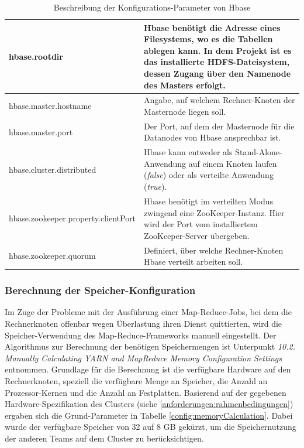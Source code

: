 \begin{table}
	\begin{tabularx}{\textwidth}{| X | X |} \hline
	hbase.rootdir &  Hbase benötigt die Adresse eines Filesystems, wo es die Tabellen ablegen kann. In dem Projekt ist es das installierte
	HDFS-Dateisystem, dessen Zugang über den Namenode des Masters erfolgt.\\ \hline
	hbase.master.hostname & Angabe, auf welchem Rechner-Knoten der Masternode liegen soll.\\ \hline
	hbase.master.port & Der Port, auf dem der Masternode für die Datanodes von Hbase ansprechbar ist. \\ \hline
	hbase.cluster.distributed & Hbase kann entweder als Stand-Alone-Anwendung auf einem Knoten laufen (\textit{false}) oder als verteilte
	 Anwendung (\textit{true}). \\ \hline
	hbase.zookeeper.property.clientPort & Hbase benötigt im verteilten Modus zwingend eine ZooKeeper-Instanz. Hier wird der Port vom
	 installiertem ZooKeeper-Server übergeben.\\ \hline
	hbase.zookeeper.quorum &  Definiert, über welche Rechner-Knoten Hbase verteilt arbeiten soll. \\ \hline
	\end{tabularx}
	\caption{Beschreibung der Konfigurations-Parameter von Hbase}
	\label{config:hbaseDescription}
\end{table}

\subsubsection{Berechnung der Speicher-Konfiguration}
\label{anforderung:berechungSpeicher}
Im Zuge der Probleme mit der Ausführung einer Map-Reduce-Jobs, bei dem die Rechnerknoten
offenbar wegen Überlastung ihren Dienst quittierten, wird die Speicher-Verwendung
des Map-Reduce-Frameworks manuell eingestellt. Der Algorithmus zur Berechnung der 
benötigen Speichermengen ist \cite{memoryCal} Unterpunkt \textit{ 10.2. Manually Calculating YARN and MapReduce Memory Configuration Settings} entnommen.
Grundlage für die Berechnung ist die verfügbare Hardware auf den Rechnerknoten, speziell
die verfügbare Menge an Speicher, die Anzahl an Prozessor-Kernen und die Anzahl an 
Festplatten. Basierend auf der gegebenen Hardware-Spezifikation des Clusters 
(siehe \ref{anforderungen:rahmenbedingungen}) ergaben sich die Grund-Parameter in Tabelle
\ref{config:memoryCalculation}.
Dabei wurde der verfügbare Speicher von 32 auf 8 GB gekürzt, um die Speichernutzung der
anderen Teams auf dem Cluster zu berücksichtigen.

